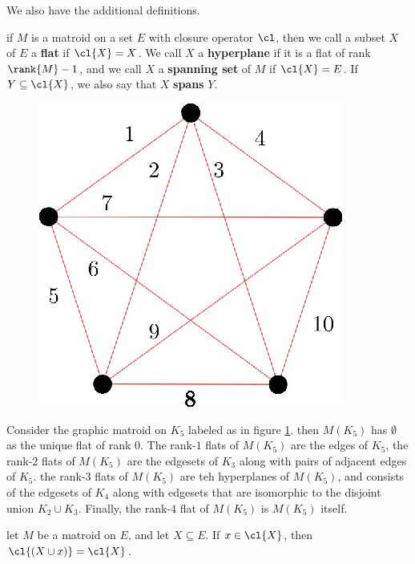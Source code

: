 We also have the additional definitions.

\begin{definition}
    if $M$ is a matroid on a set  $E$ with closure operator $\cl$, then we call
    a subset $X$ of  $E$ a  \textbf{flat} if $\cl{X}=X$. We call $X$ a
    \textbf{hyperplane} if it is a flat of rank $\rank{M}-1$, and we call $X$ a
     \textbf{spanning set} of $M$ if  $\cl{X}=E$. If $Y \subseteq \cl{X}$, we
     also say that $X$  \textbf{spans} $Y$.
\end{definition}

\begin{example}\label{1.15}
    \begin{figure}[h]
        \centering
        \includegraphics[scale=1.0]{Figures/Chapter1/closure_K_5.eps}
        \caption{}
        \label{fig_1.7}
    \end{figure}
    Consider the graphic matroid on $K_5$ labeled as in figure \ref{fig_1.7}.
    then $M(K_5)$ has $\emptyset$ as the unique flat of rank  $0$. The rank-$1$
    flats of $M(K_5)$ are the edges of $K_5$, the rank-$2$ flats of $M(K_5)$ are
    the edgesets of  $K_3$ along with pairs of adjacent edges of $K_5$. the
    rank-$3$ flats of $M(K_5)$ are teh hyperplanes of  $M(K_5)$, and consists of
    the edgesets of  $K_4$ along with edgesets that are isomorphic to the
    disjoint union $K_2 \cup K_3$. Finally, the rank-$4$ flat of $M(K_5)$ is
    $M(K_5)$ itself.
\end{example}

\begin{lemma}\label{1.4.6}
    let $M$ be a matroid on  $E$, and let  $X \subseteq E$. If  $x \in \cl{X}$,
    then $\cl{(X \cup x)}=\cl{X}$.
\end{lemma}

